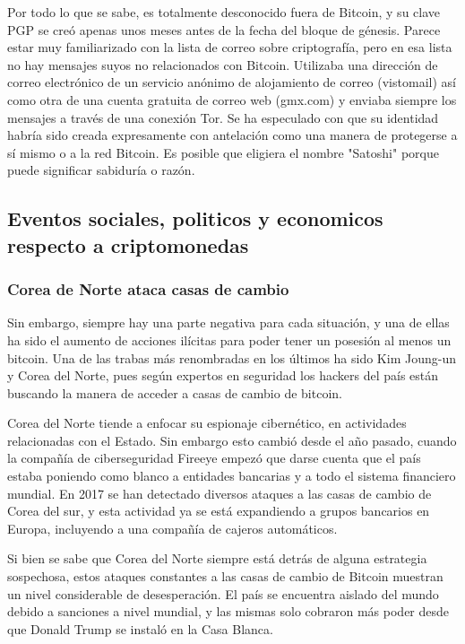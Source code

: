 \documentclass[12pt,letterpaper]{article}
\begin{document}
Por todo lo que se sabe, es totalmente desconocido fuera de Bitcoin, y su clave PGP se cre\'o apenas unos meses antes de la fecha del bloque de g\'enesis. Parece estar muy familiarizado con la lista de correo sobre criptograf\'ia, pero en esa lista no hay mensajes suyos no relacionados con Bitcoin. Utilizaba una direcci\'on de correo electr\'onico de un servicio an\'onimo de alojamiento de correo (vistomail) as\'i como otra de una cuenta gratuita de correo web (gmx.com) y enviaba siempre los mensajes a trav\'es de una conexi\'on Tor. Se ha especulado con que su identidad habr\'ia sido creada expresamente con antelaci\'on como una manera de protegerse a s\'i mismo o a la red Bitcoin. Es posible que eligiera el nombre "Satoshi" porque puede significar sabidur\'ia o raz\'on. 

            \subsection*{Eventos sociales, politicos y economicos respecto a criptomonedas}
           	\subsubsection*{Corea de Norte ataca casas de cambio}
           	Sin embargo, siempre hay una parte negativa para cada situaci\'on, y una de ellas ha sido el aumento de acciones il\'icitas para poder tener un posesi\'on al menos un bitcoin. Una de las trabas m\'as renombradas en los \'ultimos ha sido Kim Joung-un y Corea del Norte, pues seg\'un expertos en seguridad los hackers del pa\'is est\'an buscando la manera de acceder a casas de cambio de bitcoin.

Corea del Norte tiende a enfocar su espionaje cibern\'etico, en actividades relacionadas con el Estado. Sin embargo esto cambi\'o desde el año pasado, cuando la compañ\'ia de ciberseguridad Fireeye empez\'o que darse cuenta que el pa\'is estaba poniendo como blanco a entidades bancarias y a todo el sistema financiero mundial. En 2017 se han detectado diversos ataques a las casas de cambio de Corea del sur, y esta actividad ya se est\'a expandiendo a grupos bancarios en Europa, incluyendo a una compañ\'ia de cajeros autom\'aticos.
               
               Si bien se sabe que Corea del Norte siempre est\'a detr\'as de alguna estrategia sospechosa, estos ataques constantes a las casas de cambio de Bitcoin muestran un nivel considerable de desesperaci\'on. El pa\'is se encuentra aislado del mundo debido a sanciones a nivel mundial, y las mismas solo cobraron m\'as poder desde que Donald Trump se instal\'o en la Casa Blanca.
              
\end{document}

